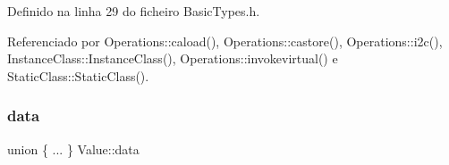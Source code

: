 Definido na linha 29 do ficheiro Basic\+Types.\+h.



Referenciado por Operations\+::caload(), Operations\+::castore(), Operations\+::i2c(), Instance\+Class\+::\+Instance\+Class(), Operations\+::invokevirtual() e Static\+Class\+::\+Static\+Class().

\mbox{\label{structValue_a2835134be157447a3ceda1a1e839ba9e}} 
\subsubsection{\texorpdfstring{data}{data}}
{\footnotesize\ttfamily union \{ ... \}   Value\+::data}



